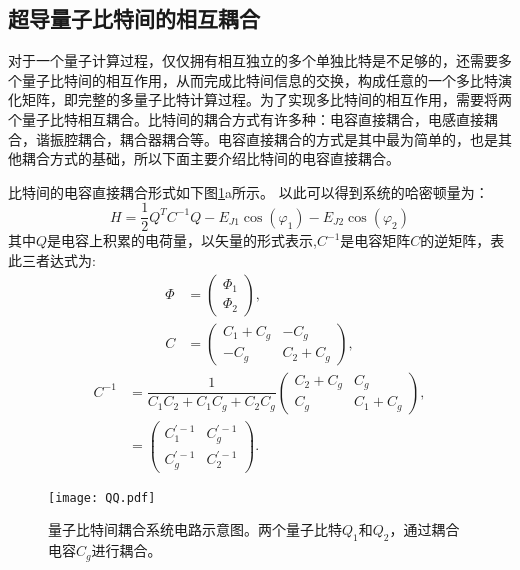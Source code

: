 \subsection{超导量子比特间的相互耦合}
对于一个量子计算过程，仅仅拥有相互独立的多个单独比特是不足够的，还需要多个量子比特间的相互作用，从而完成比特间信息的交换，构成任意的一个多比特演化矩阵，即完整的多量子比特计算过程。为了实现多比特间的相互作用，需要将两个量子比特相互耦合。比特间的耦合方式有许多种：电容直接耦合，电感直接耦合，谐振腔耦合，耦合器耦合等。电容直接耦合的方式是其中最为简单的，也是其他耦合方式的基础，所以下面主要介绍比特间的电容直接耦合。

比特间的电容直接耦合形式如下图\ref{fig:QQ}a所示。
以此可以得到系统的哈密顿量为：
\begin{equation}
		H= \frac{1}{2}{Q}^{T}{C^{-1}}{Q}-E_{J1}\cos(\varphi_1)-E_{J2}\cos(\varphi_2)
\end{equation} 
其中$Q$是电容上积累的电荷量，以矢量的形式表示,${C^{-1}}$是电容矩阵${C}$的逆矩阵，表此三者达式为:
\begin{align}
	{\Phi} &= \left(\begin{array}{l}
		\Phi_{1}\\
		\Phi_{2}
	\end{array}
	\right),\\
	{C} &= \left(\begin{array}{cc}
		C_{1}+C_{g} & -C_{g}\\
		-C_{g} & C_{2}+C_{g}
	\end{array}
	\right),	
\end{align}
\begin{equation}
	\begin{split}
		{C^{-1}} & =  \dfrac{1}{C_{1}C_{2}+C_{1}C_{g}+C_{2}C_{g}}
		\left(
		\begin{array}{cc}
			C_{2}+C_{g} & C_{g}\\
			C_{g} & C_{1}+C_{g}
		\end{array}
		\right) ,\\
		&=\left(
		\begin{array}{cc}
			C_{1}^{'-1} & C_{g}^{'-1}\\
			C_{g}^{'-1} & C_{2}^{'-1}
		\end{array}
		\right).
	\end{split}		
\end{equation}

\begin{figure}[h]
	\centering
	\texttt{[image: QQ.pdf]}
	\caption{量子比特间耦合系统电路示意图。两个量子比特$Q_{1}$和$Q_{2}$，通过耦合电容$C_{g}$进行耦合。}
	\label{fig:QQ}
\end{figure}

